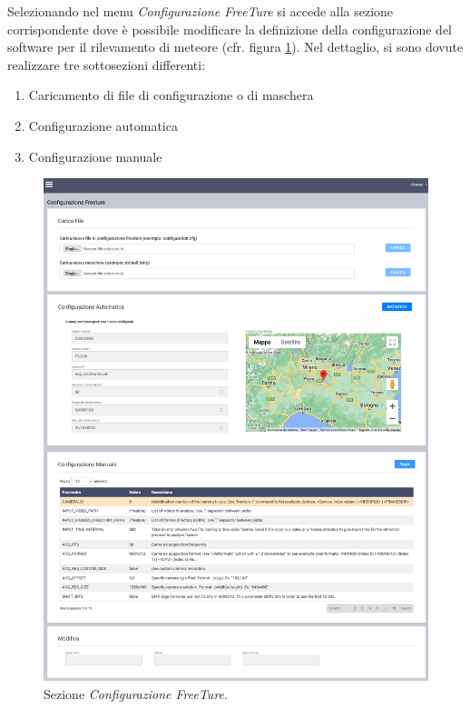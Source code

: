 Selezionando nel menu \emph{Configurazione FreeTure} si accede alla sezione corrispondente dove è possibile modificare la definizione della configurazione del software per il rilevamento di meteore (cfr. figura \ref{fig:freeture}).
Nel dettaglio, si sono dovute realizzare tre sottosezioni differenti:
\begin{enumerate}
    \item Caricamento di file di configurazione o di maschera
    \item Configurazione automatica
    \item Configurazione manuale
\end{enumerate}

\begin{figure}
    \begin{center}
    \includegraphics[width=\textwidth]{images/full-freeture.png}
    \caption{Sezione \emph{Configurazione FreeTure}.}
    \label{fig:freeture}
    \end{center}
\end{figure}

